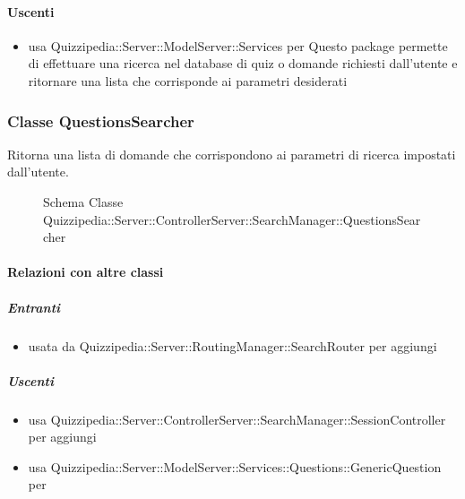 \paragraph{Uscenti}
\begin{itemize}
\item usa Quizzipedia::Server::ModelServer::Services per Questo package permette di effettuare una ricerca nel database di quiz o domande richiesti dall'utente e ritornare una lista che corrisponde ai parametri desiderati
\end{itemize}
\subsubsection{Classe QuestionsSearcher}
Ritorna una lista di domande che corrispondono ai parametri di ricerca impostati dall'utente.
\begin{figure}[H]
\centering
\noindent{}
\caption[Schema Classe QuestionsSearcher]{Schema Classe Quizzipedia::Server::ControllerServer::SearchManager::QuestionsSearcher}
\end{figure}
\paragraph{Relazioni con altre classi}
\subparagraph{Entranti}
\begin{itemize}
\item usata da Quizzipedia::Server::RoutingManager::SearchRouter per aggiungi
\end{itemize}
\subparagraph{Uscenti}
\begin{itemize}
\item usa Quizzipedia::Server::ControllerServer::SearchManager::SessionController per aggiungi
\item usa Quizzipedia::Server::ModelServer::Services::Questions::GenericQuestion per 
\end{itemize}

